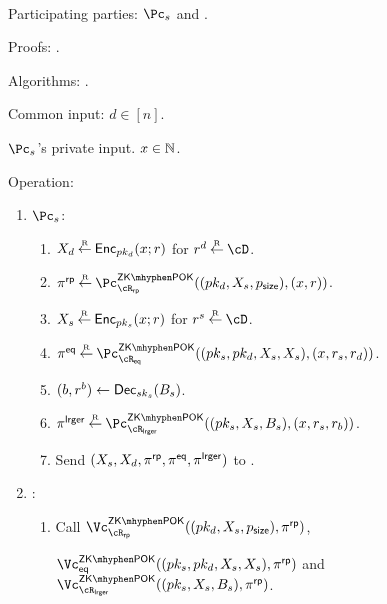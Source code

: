\begin{protocol}~\label{prot:ConfidentialTransactions:Transfer}
	\item[Participating parties:] $\Pc_s$ and \Cc.
	
\item[Proofs:]   \piZKPOK{\rRP}. 


\item[Algorithms:]    \Dec.

	
	\item[Common input:] $d\in [n]$.
	
	\item[$\Pc_s$'s private  input.] $x \in {\mathbb{N}}$.
	
\item[Operation:] ~
	
	\begin{enumerate}
		\item  $\Pc_s$: 
		
		\begin{enumerate}
			\item $X_d \mathbin{\stackrel{\mbox{\tiny R}}{\leftarrow}} \mathsf{Enc}_{pk_d}(x;r)$ for $r^d \getsr \cD$.
			
		
			\item $\pi^\RPs \getsr \pZKPOK{\rRP}((pk_d,X_s,\psize),(x,r))$.
			
			
			\item $X_s \mathbin{\stackrel{\mbox{\tiny R}}{\leftarrow}} \mathsf{Enc}_{pk_s}(x;r)$ for $r^s \getsr \cD$.
			
			
			
			\item $\pi^\Eqs \getsr \pZKPOK{\rEQ}((pk_s,pk_d,X_s,X_s),(x,r_s,r_d))$.
			
			
			\item $(b,r^b) \leftarrow \mathsf{Dec}_{sk_s}(B_s)$.
			
			
			\item $\pi^\Lrgs \getsr \pZKPOK{\rLrg}((pk_s,X_s,B_s),(x,r_s,r_b))$.
			
			
			\item Send $(X_s,X_d,\pi^{\sf rp},\pi^{\sf eq},\pi^{\sf lrger})$ to \Cc.
		\end{enumerate}
		
		
		\item  \Cc: 
		
		\begin{enumerate}
			\item  Call $\vZKPOK{\rRP}((pk_d,X_s,\psize),\pi^\RPs)$,
			
			 $\vZKPOK{\Eqs}((pk_s,pk_d,X_s,X_s),\pi^\RPs)$ and $\vZKPOK{\rLrg}((pk_s,X_s,B_s),\pi^\RPs)$.
			

\end{enumerate}
\end{enumerate}
\end{protocol}
